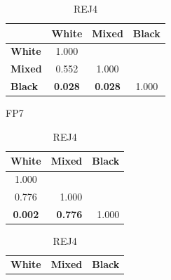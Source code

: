 \begin{table}
    \scriptsize
    \centering
    \setlength\tabcolsep{2pt}
    \begin{subtable}{.275\textwidth}
        \centering
        \begin{tabular}{lccc}
            \toprule
                           & \textbf{White}                         & \textbf{Mixed}                         & \textbf{Black} \\
            \midrule
            \textbf{White} & 1.000                                  &                                        &                \\
            \textbf{Mixed} & 0.552                                  & 1.000                                  &                \\
            \textbf{Black} & \cellcolor[HTML]{EFEFEF}\textbf{0.028} & \cellcolor[HTML]{EFEFEF}\textbf{0.028} & 1.000          \\
            \bottomrule
        \end{tabular}
        \caption{FP7}
    \end{subtable}%
    \begin{subtable}{.21\textwidth}
        \centering
        \begin{tabular}{ccc}
            \toprule
            \multicolumn{1}{l}{\textbf{White}}     & \textbf{Mixed}                                             & \textbf{Black}            \\
            \midrule
            1.000                                  &                                                            &                           \\
            0.776                                  & \multicolumn{1}{r}{1.000}                                  &                           \\
            \cellcolor[HTML]{EFEFEF}\textbf{0.002} & \multicolumn{1}{r}{\cellcolor[HTML]{EFEFEF}\textbf{0.776}} & \multicolumn{1}{r}{1.000} \\
            \bottomrule
        \end{tabular}
        \caption{REJ4}
    \end{subtable}%
    \begin{subtable}{.21\textwidth}
        \centering
        \begin{tabular}{ccc}
            \toprule
            \multicolumn{1}{l}{\textbf{White}}     & \textbf{Mixed}            & \textbf{Black}            \\

\end{tabular}
\end{subtable}
\end{table}
